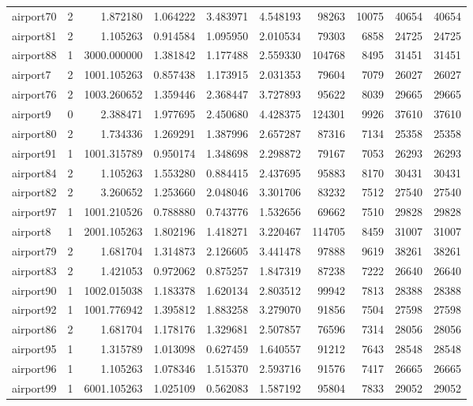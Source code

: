 \begin{longtable}{|l|r|r|r|r|r|r|r|r|r|}
airport70 & 2 & 1.872180 & 1.064222 & 3.483971 & 4.548193 & 98263 & 10075 & 40654 & 40654 \\
airport81 & 2 & 1.105263 & 0.914584 & 1.095950 & 2.010534 & 79303 & 6858 & 24725 & 24725 \\
airport88 & 1 & 3000.000000 & 1.381842 & 1.177488 & 2.559330 & 104768 & 8495 & 31451 & 31451 \\
airport7 & 2 & 1001.105263 & 0.857438 & 1.173915 & 2.031353 & 79604 & 7079 & 26027 & 26027 \\
airport76 & 2 & 1003.260652 & 1.359446 & 2.368447 & 3.727893 & 95622 & 8039 & 29665 & 29665 \\
airport9 & 0 & 2.388471 & 1.977695 & 2.450680 & 4.428375 & 124301 & 9926 & 37610 & 37610 \\
airport80 & 2 & 1.734336 & 1.269291 & 1.387996 & 2.657287 & 87316 & 7134 & 25358 & 25358 \\
airport91 & 1 & 1001.315789 & 0.950174 & 1.348698 & 2.298872 & 79167 & 7053 & 26293 & 26293 \\
airport84 & 2 & 1.105263 & 1.553280 & 0.884415 & 2.437695 & 95883 & 8170 & 30431 & 30431 \\
airport82 & 2 & 3.260652 & 1.253660 & 2.048046 & 3.301706 & 83232 & 7512 & 27540 & 27540 \\
airport97 & 1 & 1001.210526 & 0.788880 & 0.743776 & 1.532656 & 69662 & 7510 & 29828 & 29828 \\
airport8 & 1 & 2001.105263 & 1.802196 & 1.418271 & 3.220467 & 114705 & 8459 & 31007 & 31007 \\
airport79 & 2 & 1.681704 & 1.314873 & 2.126605 & 3.441478 & 97888 & 9619 & 38261 & 38261 \\
airport83 & 2 & 1.421053 & 0.972062 & 0.875257 & 1.847319 & 87238 & 7222 & 26640 & 26640 \\
airport90 & 1 & 1002.015038 & 1.183378 & 1.620134 & 2.803512 & 99942 & 7813 & 28388 & 28388 \\
airport92 & 1 & 1001.776942 & 1.395812 & 1.883258 & 3.279070 & 91856 & 7504 & 27598 & 27598 \\
airport86 & 2 & 1.681704 & 1.178176 & 1.329681 & 2.507857 & 76596 & 7314 & 28056 & 28056 \\
airport95 & 1 & 1.315789 & 1.013098 & 0.627459 & 1.640557 & 91212 & 7643 & 28548 & 28548 \\
airport96 & 1 & 1.105263 & 1.078346 & 1.515370 & 2.593716 & 91576 & 7417 & 26665 & 26665 \\
airport99 & 1 & 6001.105263 & 1.025109 & 0.562083 & 1.587192 & 95804 & 7833 & 29052 & 29052 \\

\end{longtable}
